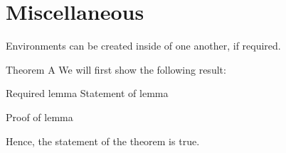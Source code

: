 \documentclass[a4paper,12pt]{article}
\begin{document}
\section{Miscellaneous}
Environments can be created inside of one another, if required.
\begin{theorem}{Theorem A}{}
    We will first show the following result:
    \begin{lemma}{Required lemma}{}
        Statement of lemma
    \end{lemma}
    \begin{lproof*}{}{}
        Proof of lemma
    \end{lproof*}
    Hence, the statement of the theorem is true.
\end{theorem}
\end{document}
